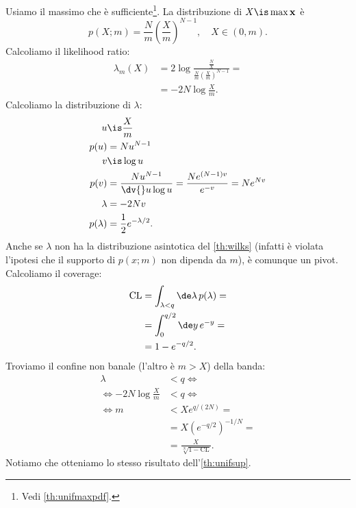 \begin{solution}
	Usiamo il massimo che è sufficiente\footnote{Vedi \autoref{th:unifmaxpdf}.}.
	La distribuzione di $X\is\max\mathbf x$ è
	\begin{equation*}
		p(X;m)
		= \frac Nm \left(\frac Xm\right)^{N-1},
		\quad X \in (0,m).
	\end{equation*}
	Calcoliamo il likelihood ratio:
	\begin{align*}
		\lambda_m(X)
		&= 2\log\frac {\frac NX} {\frac Nm \left(\frac Xm\right)^{N-1}} = \\
		&= -2N\log\frac Xm.
	\end{align*}
	Calcoliamo la distribuzione di $\lambda$:
	\begin{align*}
		u
		&\is \frac Xm \\
		p(u)
		&= N u^{N-1} \\
		v
		&\is \log u \\
		p(v)
		&= \frac{Nu^{N-1}}{\dv{}u\log u}
		= \frac{Ne^{(N-1)v}}{e^{-v}}
		= N e^{Nv} \\
		\lambda
		&= -2Nv \\
		p(\lambda)
		&= \frac 12 e^{-\lambda/2}.
	\end{align*}
	Anche se $\lambda$ non ha la distribuzione asintotica del \autoref{th:wilks}
	(infatti è violata l'ipotesi che il supporto di $p(x;m)$ non dipenda da $m$),
	è comunque un pivot.
	Calcoliamo il coverage:
	\begin{align*}
		\mathrm{CL}
		&= \int_{\lambda<q} \de\lambda\, p(\lambda) = \\
		&= \int_0^{q/2} \de y\, e^{-y} = \\
		&= 1 - e^{-q/2}.
	\end{align*}
	Troviamo il confine non banale (l'altro è $m>X$) della banda:
	\begin{align*}
		\lambda
		&< q \iff \\
		\iff -2N\log\frac Xm
		&< q \iff \\
		\iff m
		&< Xe^{q/(2N)} = \\
		&= X\left(e^{-q/2}\right)^{-1/N} = \\
		&= \frac X {\sqrt[N]{1-\mathrm{CL}}}.
	\end{align*}
	Notiamo che otteniamo lo stesso risultato dell'\autoref{th:unifsup}.
\end{solution}

